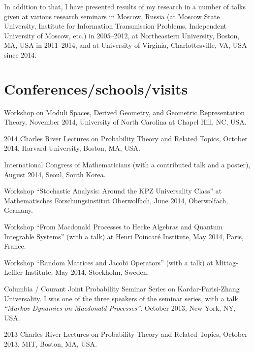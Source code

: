 \documentclass[letterpaper,11pt]{article}
\begin{document}
In addition to that, I have presented results of my research in a number of talks given at various research seminars in Moscow, Russia (at Moscow State University, Institute for Information Transmission Problems, Independent University of Moscow, etc.) in 2005--2012, at Northeastern University, Boston, MA, USA in 2011--2014, and
at University of Virginia, Charlottesville, VA, USA since 2014.

\section*{Conferences/schools/visits}

\begin{etaremune}

\item Workshop on Moduli Spaces, Derived Geometry, and Geometric Representation Theory, November 2014, University of North Carolina at Chapel Hill, NC, USA.

\item 2014 Charles River Lectures on Probability Theory and Related Topics, 
October 2014, Harvard University, Boston, MA, USA.

\item International Congress of Mathematicians (with a contributed talk and a poster), August 2014, 
Seoul, South Korea.

\item Workshop ``Stochastic Analysis: Around the KPZ Universality Class'' at Mathematisches Forschungsinstitut Oberwolfach,
June 2014, Oberwolfach, Germany.

\item Workshop 
``From Macdonald Processes to Hecke Algebras and Quantum Integrable Systems'' (with a talk)
at Henri Poincar\'e Institute,
May 2014, Paris, France.

\item 
Workshop
``Random Matrices and Jacobi Operators''
(with a talk) at 
Mittag-Leffler Institute,
May 2014, Stockholm, Sweden.

\item
Columbia / Courant Joint Probability Seminar Series on Kardar-Parisi-Zhang Universality. 
I was one of the three speakers of the seminar series,
with a talk
\emph{``Markov Dynamics on Macdonald Processes''}.
October 2013, New York, NY, USA.

\item 2013 Charles River Lectures on Probability Theory and Related Topics, 
October 2013, MIT, Boston, MA, USA.


\end{etaremune}
\end{document}
